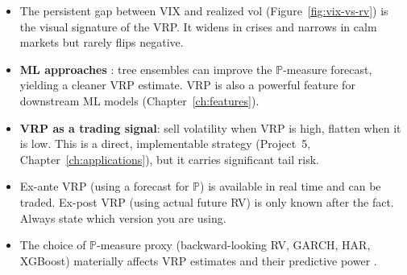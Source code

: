 \begin{itemize}[nosep]
  \item The persistent gap between VIX and realized vol (Figure~\ref{fig:vix-vs-rv}) is the visual signature of the VRP. It widens in crises and narrows in calm markets but rarely flips negative.

  \item \textbf{ML approaches} \citep{Fouhy2024}: tree ensembles can improve the $\mathbb{P}$-measure forecast, yielding a cleaner VRP estimate. VRP is also a powerful feature for downstream ML models (Chapter~\ref{ch:features}).

  \item \textbf{VRP as a trading signal}: sell volatility when VRP is high, flatten when it is low. This is a direct, implementable strategy (Project~5, Chapter~\ref{ch:applications}), but it carries significant tail risk.

  \item Ex-ante VRP (using a forecast for $\mathbb{P}$) is available in real time and can be traded. Ex-post VRP (using actual future RV) is only known after the fact. Always state which version you are using.

  \item The choice of $\mathbb{P}$-measure proxy (backward-looking RV, GARCH, HAR, XGBoost) materially affects VRP estimates and their predictive power \citep{BekaertHoerova2014}.
\end{itemize}


